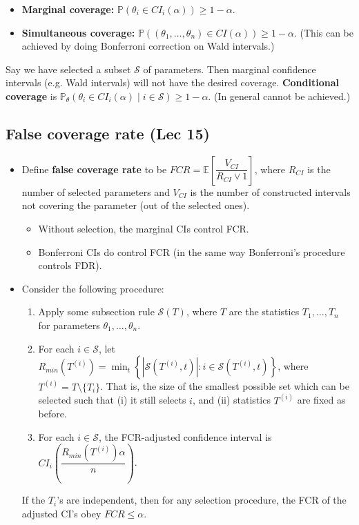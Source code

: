 \documentclass[twoside]{article}
\newcommand\bbE{\mathbb{E}}
\newcommand\bbP{\mathbb{P}}
\newcommand\calS{\mathcal{S}}
\def\t{\theta}
\begin{document}
\begin{itemize}
\item \textbf{Marginal coverage:} $\bbP (\t_i \in CI_i(\alpha)) \geq 1 - \alpha$.

\item \textbf{Simultaneous coverage:} $\bbP ((\t_1, \dots, \t_n) \in CI(\alpha)) \geq 1 - \alpha$. (This can be achieved by doing Bonferroni correction on Wald intervals.)
\end{itemize}

Say we have selected a subset $\calS$ of parameters. Then marginal confidence intervals (e.g. Wald intervals) will not have the desired coverage. \textbf{Conditional coverage} is $\bbP_\t (\t_i \in CI_i(\alpha) \mid i \in \calS) \geq 1 - \alpha$. (In general cannot be achieved.)

\subsection{False coverage rate (Lec 15)}
\begin{itemize}
\item Define \textbf{false coverage rate} to be $FCR = \bbE \left[\dfrac{V_{CI}}{R_{CI} \vee 1} \right]$, where $R_{CI}$ is the number of selected parameters and $V_{CI}$ is the number of constructed intervals not covering the parameter (out of the selected ones).
\begin{itemize}
\item Without selection, the marginal CIs control FCR.

\item Bonferroni CIs do control FCR (in the same way Bonferroni's procedure controls FDR).
\end{itemize}

\item Consider the following procedure:
\begin{enumerate}
\item Apply some subsection rule $\calS(T)$, where $T$ are the statistics $T_1, \dots, T_n$ for parameters $\t_1, \dots, \t_n$.

\item For each $i \in \calS$, let $R_{min}(T^{(i)}) = \min_t \left\{ |\calS(T^{(i)}, t)|: i \in \calS(T^{(i)}, t) \right\}$, where $T^{(i)} = T \setminus \{ T_i\}$. That is, the size of the smallest possible set which can be selected such that (i) it still selects $i$, and (ii) statistics $T^{(i)}$ are fixed as before.

\item For each $i \in \calS$, the FCR-adjusted confidence interval is $CI_i \left( \dfrac{R_{min}(T^{(i)})\alpha}{n} \right)$.
\end{enumerate}

If the $T_i$'s are independent, then for any selection procedure, the FCR of the adjusted CI's obey $FCR \leq \alpha$.

\end{itemize}
\end{document}
